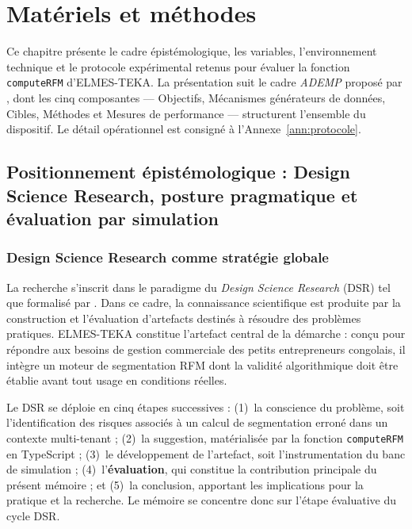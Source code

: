 \chapter{Matériels et méthodes}
\label{chap:methodes}

Ce chapitre présente le cadre épistémologique, les variables, l'environnement technique et le
protocole expérimental retenus pour évaluer la fonction \texttt{computeRFM} d'ELMES-TEKA.
La présentation suit le cadre \emph{ADEMP} proposé par \citet{Morris2019}, dont les cinq
composantes — Objectifs, Mécanismes générateurs de données, Cibles, Méthodes et Mesures de
performance — structurent l'ensemble du dispositif. Le détail opérationnel est consigné à
l'Annexe~\ref{ann:protocole}.

\section{Positionnement épistémologique : Design Science Research, posture pragmatique
et évaluation par simulation}
\label{sec:methodes-epistemologie}

\subsection{Design Science Research comme stratégie globale}
\label{subsec:methodes-dsr}

La recherche s'inscrit dans le paradigme du \emph{Design Science Research}
(DSR) tel que formalisé par \citet{Hevner2004}.
Dans ce cadre, la connaissance scientifique est produite par la construction et
l'évaluation d'artefacts destinés à résoudre des problèmes pratiques. ELMES-TEKA
constitue l'artefact central de la démarche : conçu pour répondre aux besoins de gestion
commerciale des petits entrepreneurs congolais, il intègre un moteur de segmentation RFM
dont la validité algorithmique doit être établie avant tout usage en conditions réelles.

Le DSR se déploie en cinq étapes successives : (1)~la conscience du problème, soit
l'identification des risques associés à un calcul de segmentation erroné dans un contexte
multi-tenant ; (2)~la suggestion, matérialisée par la fonction \texttt{computeRFM} en
TypeScript ; (3)~le développement de l'artefact, soit l'instrumentation du banc de
simulation ; (4)~l'\textbf{évaluation}, qui constitue la contribution principale du présent
mémoire ; et (5)~la conclusion, apportant les implications pour la pratique et la recherche.
Le mémoire se concentre donc sur l'étape évaluative du cycle DSR.

